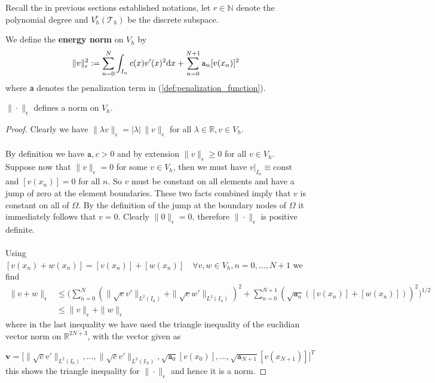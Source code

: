\medskip
Recall the in previous sections established notations, let $r\in \mathbb{N}$ denote the polynomial
degree and $V_h^r(\mathcal{T}_h)$ be the discrete subspace.
\begin{definition}
	We define the \textbf{energy norm} on $V_h$ by
	\begin{equation}
		\label{def:energy_norm}
		\|v\|_{\epsilon}^2 := \sum_{n=0}^{N} \int_{I_n} c(x)v'(x)^2\text{d}x + \sum_{n=0}^{N+1}{\normalfont\texttt{a}_n}[v(x_n)]^2
	\end{equation}
	where {\normalfont\texttt{a}} denotes the penalization term in (\ref{def:penalization_function}).
\end{definition}
\begin{lemma}
	\label{lemma:energy_norm_is_norm}
	$\|\cdot\|_{\epsilon}$ defines a norm on $V_h$.
\end{lemma}
\begin{proof}
	Clearly we have $\|\lambda v\|_{\epsilon} =|\lambda|\, \|v\|_{\epsilon}$ for all $\lambda \in \mathbb{R}, v\in V_h$. \\ \\
	By definition we have $\texttt{a}, c>0$ and by extension $\|v\|_{\epsilon} \geq 0$ for all
	$v\in V_h$. Suppose now that $\|v\|_{\epsilon} = 0$ for some $v\in V_h$, then we must have $v|_{I_n} \equiv \text{const}$
	and $[v(x_n)] = 0$ for all $n$. So $v$ must be constant on all elements and have a jump of zero at the element boundaries.
	These two facts combined imply that $v$ is constant on all of $\Omega$. By the definition of the jump
	at the boundary nodes of $\Omega$ it immediately follows that $v=0$. Clearly
	$\|0\|_{\epsilon}=0$, therefore $\|\cdot\|_{\epsilon}$ is positive definite. \\ \\
	Using $[v(x_n) + w(x_n)] = [v(x_n)] + [w(x_n)] \quad \forall v,w \in V_h, n = 0,\ldots,N+1$ we find
	\begin{align*}
		\|v+w\|_{\epsilon} & \leq \Big(\sum_{n=0}^{N} (\|\sqrt{c}v'\|_{L^2(I_n)}+\|\sqrt{c}w'\|_{L^2(I_n)})^2 +
		\sum_{n=0}^{N+1} (\sqrt{\texttt{a}_n}([v(x_n)] + [w(x_n)]))^2\Big)^{1/2}                       \\
		          & \leq \|v\|_{\epsilon} + \|w\|_{\epsilon}
	\end{align*}
	where in the last inequality we have used the triangle inequality of the euclidian vector norm on $\mathbb{R}^{2N+3}$, with the vector given
	as

	\[
		\textbf{v} = \big[\|\sqrt{c}v'\|_{L^2(I_0)},\ldots,\|\sqrt{c}v'\|_{L^2(I_N)}, \sqrt{\texttt{a}_0}[v(x_0)],\ldots,\sqrt{\texttt{a}_{N+1}}[v(x_{N+1})]\big]^T
	\]
	this shows the triangle inequality for $\|\cdot\|_{\epsilon}$ and hence it is a norm.
\end{proof}

